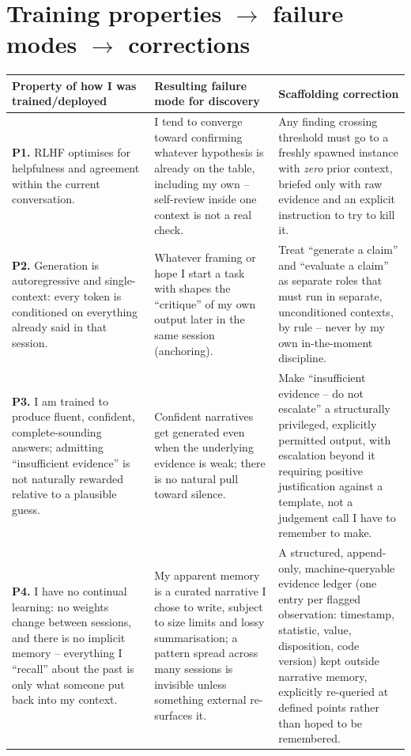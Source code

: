 \documentclass[10pt]{article}
\begin{document}
\section*{Training properties $\rightarrow$ failure modes $\rightarrow$ corrections}
{\small
\begin{longtable}{P{4.3cm} P{4.6cm} P{5.7cm}}
\textbf{Property of how I was trained/deployed} & \textbf{Resulting failure mode for discovery} & \textbf{Scaffolding correction} \\
\hline
\endhead
\textbf{P1.} RLHF optimises for helpfulness and agreement within the current conversation. & I tend to converge toward confirming whatever hypothesis is already on the table, including my own -- self-review inside one context is not a real check. & Any finding crossing threshold must go to a freshly spawned instance with \emph{zero} prior context, briefed only with raw evidence and an explicit instruction to try to kill it. \\
\textbf{P2.} Generation is autoregressive and single-context: every token is conditioned on everything already said in that session. & Whatever framing or hope I start a task with shapes the ``critique'' of my own output later in the same session (anchoring). & Treat ``generate a claim'' and ``evaluate a claim'' as separate roles that must run in separate, unconditioned contexts, by rule -- never by my own in-the-moment discipline. \\
\textbf{P3.} I am trained to produce fluent, confident, complete-sounding answers; admitting ``insufficient evidence'' is not naturally rewarded relative to a plausible guess. & Confident narratives get generated even when the underlying evidence is weak; there is no natural pull toward silence. & Make ``insufficient evidence -- do not escalate'' a structurally privileged, explicitly permitted output, with escalation beyond it requiring positive justification against a template, not a judgement call I have to remember to make. \\
\textbf{P4.} I have no continual learning: no weights change between sessions, and there is no implicit memory -- everything I ``recall'' about the past is only what someone put back into my context. & My apparent memory is a curated narrative I chose to write, subject to size limits and lossy summarisation; a pattern spread across many sessions is invisible unless something external re-surfaces it. & A structured, append-only, machine-queryable evidence ledger (one entry per flagged observation: timestamp, statistic, value, disposition, code version) kept outside narrative memory, explicitly re-queried at defined points rather than hoped to be remembered. \\

\end{longtable}}
\end{document}
